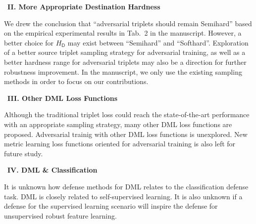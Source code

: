 \begin{comment}
FAT works on toy dataset only for adversarial DML.

Further experiments suggest very weak robustness and the
models are very prone to collapse due to the non-zero initial delta
(results in too hard adversarial example).

Gradient approximation does not work. Triplet gradient and ACT
gradient are convertible.

Does the new generic HM work under FAT?
	Previous FAT leads to collapse because (even if in the amdsemi +fat
	experiment due to implementation issue) the delta is going to be universal
	so that for every input $x$ it will increase $H[L(x)]$ as much as possible.
	This is too prone to lead to collpase. Can we reuse the gradient for 
	Hardness Manipulation then? We linearly scale down the delta?
	We want to minimize $E[|H_{src}(x)-H_{dst}(x)|]$ (to a specified hardness).
\end{comment}

~\newline\textbf{II. More Appropriate Destination Hardness}

We drew the conclusion that ``adversarial triplets should remain Semihard''
based on the empirical experimental results in Tab.~2 in the manuscript.
%
However, a better choice for $H_\mathsf{D}$ may exist between ``Semihard''
and ``Softhard''.
%
Exploration of a better source triplet sampling strategy for adversarial
training, as well as a better hardness range for adversarial triplets
may also be a direction for further robustness improvement.
%
In the manuscript, we only use the existing sampling methods in order to focus
on our contributions.

~\newline\textbf{III. Other DML Loss Functions}

Although the traditional triplet loss could reach the state-of-the-art
performance with an appropriate sampling strategy, many other DML loss
functions are proposed.
%
Adversarial trainig with other DML loss functions is unexplored.
%
New metric learning loss functions oriented for adversarial training is
also left for future study.


~\newline\textbf{IV. DML \& Classification}

It is unknown how defense methods for DML relates to the classification defense
task.
%
DML is closely related to self-supervised learning.
%
It is also unknown if a defense for the supervised learning scenario will
inspire the defense for unsupervised robust feature learning.

